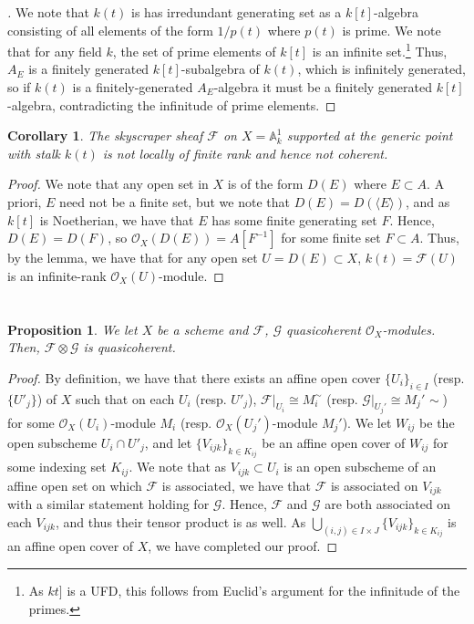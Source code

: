 \documentclass[english,letter,doublesided]{article}
\newcommand{\evat}[3]{\left. #1\right|_{#2}^{#3}}
\renewcommand{\AA}{\mathbb{A}}
\newcommand{\OO}{\mathcal{O}}
\newcommand{\Fcal}{\mathcal{F}}
\newcommand{\Gcal}{\mathcal{G}}
\newcommand{\fsc}{\mathscr{F}}
\newenvironment{subproof}[1][\proofname]{%
	\renewcommand{\qedsymbol}{$\blacksquare$}%
	\begin{proof}[#1]%
	}{%
	\end{proof}%
}
\newcommand{\prob}[1]{\setcounter{section}{#1-1}\section{}}
\newtheorem*{proposition*}{Proposition}
\newtheorem*{corollary*}{Corollary}
\theoremstyle{remark}
\theoremstyle{definition}
\newcommand{\idl}[1]{\langle #1 \rangle}
\newcommand{\restr}[2]{\evat{#1}{#2}{}}
\begin{document}
\begin{subproof}
	We note that $k(t)$ is has irredundant generating set as a $k[t]$-algebra consisting of all elements of the form $1/p(t)$ where $p(t)$ is prime. We note that for any field $k$, the set of prime elements of $k[t]$ is an infinite set.\footnote{As $kt]$ is a UFD, this follows from Euclid's argument for the infinitude of the primes.} Thus, $A_E$ is a finitely generated $k[t]$-subalgebra of $k(t)$, which is infinitely generated, so if $k(t)$ is a finitely-generated $A_E$-algebra it must be a finitely generated $k[t]$-algebra, contradicting the infinitude of prime elements.
\end{subproof}
\begin{corollary*}
	The skyscraper sheaf $\fsc$ on $X=\AA_k^1$ supported at the generic point with stalk $k(t)$ is not locally of finite rank and hence not coherent. 
\end{corollary*}
\begin{proof}
	We note that any open set in $X$ is of the form $D(E)$ where $E\subset A$. A priori, $E$ need not be a finite set, but we note that $D(E)=D(\idl{E})$, and as $k[t]$ is Noetherian, we have that $E$ has some finite generating set $F$. Hence, $D(E)=D(F)$, so $\OO_X(D(E))=A[F^{-1}]$ for some finite set $F\subset A$. Thus, by the lemma, we have that for any open set $U=D(E)\subset X$, $k(t)=\fsc(U)$ is an infinite-rank $\OO_X(U)$-module.
\end{proof}
%
%
%
%
\prob{3}
\begin{proposition*}
	We let $X$ be a scheme and $\Fcal$, $\Gcal$ quasicoherent $\OO_X$-modules. Then, $\Fcal \otimes \Gcal$ is quasicoherent.
\end{proposition*}
\begin{proof}
	By definition, we have that there exists an affine open cover $\{U_i\}_{i\in I}$ (resp. $\{U'_j\}$) of $X$ such that on each $U_i$ (resp. $U'_j$), $\restr{\Fcal}{U_i}\cong M_i^\sim$ (resp. $\restr{\Gcal}{U_j'}\cong M_j'^{}\sim$) for some $\OO_X(U_i)$-module $M_i$ (resp. $\OO_X(U_j')$-module $M_j'$). We let $W_{ij}$ be the open subscheme $U_i\cap U'_j$, and let $\{V_{ijk}\}_{k\in K_{ij}}$ be an affine open cover of $W_{ij}$ for some indexing set $K_{ij}$. We note that as $V_{ijk}\subset U_i$ is an open subscheme of an affine open set on which $\Fcal$ is associated, we have that $\Fcal$ is associated on $V_{ijk}$ with a similar statement holding for $\Gcal$. Hence, $\Fcal$ and $\Gcal$ are both associated on each $V_{ijk}$, and thus their tensor product is as well. As $\bigcup_{(i,j)\in I\times J} \{V_{ijk}\}_{k\in K_{ij}}$ is an affine open cover of $X$, we have completed our proof.
\end{proof}
\end{document}
